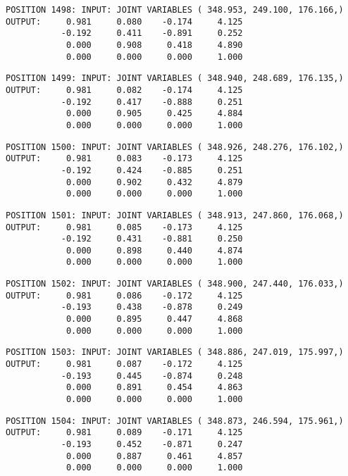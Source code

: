 \begin{verbatim}
POSITION 1498: INPUT: JOINT VARIABLES ( 348.953, 249.100, 176.166,)
OUTPUT:     0.981     0.080    -0.174     4.125
           -0.192     0.411    -0.891     0.252
            0.000     0.908     0.418     4.890
            0.000     0.000     0.000     1.000
\end{verbatim} \pagebreak[1]\begin{verbatim}
POSITION 1499: INPUT: JOINT VARIABLES ( 348.940, 248.689, 176.135,)
OUTPUT:     0.981     0.082    -0.174     4.125
           -0.192     0.417    -0.888     0.251
            0.000     0.905     0.425     4.884
            0.000     0.000     0.000     1.000
\end{verbatim} \pagebreak[1]\begin{verbatim}
POSITION 1500: INPUT: JOINT VARIABLES ( 348.926, 248.276, 176.102,)
OUTPUT:     0.981     0.083    -0.173     4.125
           -0.192     0.424    -0.885     0.251
            0.000     0.902     0.432     4.879
            0.000     0.000     0.000     1.000
\end{verbatim} \pagebreak[1]\begin{verbatim}
POSITION 1501: INPUT: JOINT VARIABLES ( 348.913, 247.860, 176.068,)
OUTPUT:     0.981     0.085    -0.173     4.125
           -0.192     0.431    -0.881     0.250
            0.000     0.898     0.440     4.874
            0.000     0.000     0.000     1.000
\end{verbatim} \pagebreak[1]\begin{verbatim}
POSITION 1502: INPUT: JOINT VARIABLES ( 348.900, 247.440, 176.033,)
OUTPUT:     0.981     0.086    -0.172     4.125
           -0.193     0.438    -0.878     0.249
            0.000     0.895     0.447     4.868
            0.000     0.000     0.000     1.000
\end{verbatim} \pagebreak[1]\begin{verbatim}
POSITION 1503: INPUT: JOINT VARIABLES ( 348.886, 247.019, 175.997,)
OUTPUT:     0.981     0.087    -0.172     4.125
           -0.193     0.445    -0.874     0.248
            0.000     0.891     0.454     4.863
            0.000     0.000     0.000     1.000
\end{verbatim} \pagebreak[1]\begin{verbatim}
POSITION 1504: INPUT: JOINT VARIABLES ( 348.873, 246.594, 175.961,)
OUTPUT:     0.981     0.089    -0.171     4.125
           -0.193     0.452    -0.871     0.247
            0.000     0.887     0.461     4.857
            0.000     0.000     0.000     1.000
\end{verbatim} \pagebreak[1]\begin{verbatim}

\end{verbatim}
